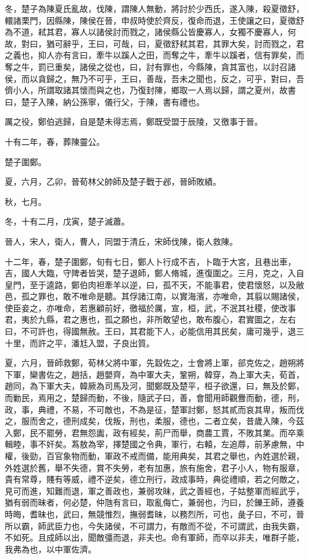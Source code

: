 \begin{pinyinscope}
冬，楚子為陳夏氏亂故，伐陳，謂陳人無動，將討於少西氏，遂入陳，殺夏徵舒，轘諸栗門，因縣陳，陳侯在晉，申叔時使於齊反，復命而退，王使讓之曰，夏徵舒為不道，弒其君，寡人以諸侯討而戮之，諸侯縣公皆慶寡人，女獨不慶寡人，何故，對曰，猶可辭乎，王曰，可哉，曰，夏徵舒弒其君，其罪大矣，討而戮之，君之義也，抑人亦有言曰，牽牛以蹊人之田，而奪之牛，牽牛以蹊者，信有罪矣，而奪之牛，罰已重矣，諸侯之從也，曰，討有罪也，今縣陳，貪其富也，以討召諸侯，而以貪歸之，無乃不可乎，王曰，善哉，吾未之聞也，反之，可乎，對曰，吾儕小人，所謂取諸其懷而與之也，乃復封陳，鄉取一人焉以歸，謂之夏州，故書曰，楚子入陳，納公孫寧，儀行父，于陳，書有禮也。

厲之役，鄭伯逃歸，自是楚未得志焉，鄭既受盟于辰陵，又徼事于晉。

十有二年，春，葬陳靈公。

楚子圍鄭。

夏，六月，乙卯，晉荀林父帥師及楚子戰于邲，晉師敗績。

秋，七月。

冬，十有二月，戊寅，楚子滅蕭。

晉人，宋人，衛人，曹人，同盟于清丘，宋師伐陳，衛人救陳。

十二年，春，楚子圍鄭，旬有七日，鄭人卜行成不吉，卜臨于大宮，且巷出車，吉，國人大臨，守陴者皆哭，楚子退師，鄭人脩城，進復圍之。三月，克之，入自皇門，至于逵路，鄭伯肉袒牽羊以逆，曰，孤不天，不能事君，使君懷怒，以及敝邑，孤之罪也，敢不唯命是聽。其俘諸江南，以實海濱，亦唯命，其翦以賜諸侯，使臣妾之，亦唯命，若惠顧前好，徼福於厲，宣，桓，武，不泯其社稷，使改事君，夷於九縣，君之惠也，孤之願也，非所敢望也，敢布腹心，君實圖之，左右曰，不可許也，得國無赦。王曰，其君能下人，必能信用其民矣，庸可幾乎，退三十里，而許之平，潘尪入盟，子良出質。

夏，六月，晉師救鄭，荀林父將中軍，先縠佐之，士會將上軍，郤克佐之，趙朔將下軍，欒書佐之，趙括，趙嬰齊，為中軍大夫，鞏朔，韓穿，為上軍大夫，荀首，趙同，為下軍大夫，韓厥為司馬及河，聞鄭既及楚平，桓子欲還，曰，無及於鄭，而勦民，焉用之，楚歸而動，不後，隨武子曰，善，會聞用師觀釁而動，德，刑，政，事，典禮，不易，不可敵也，不為是征，楚軍討鄭，怒其貳而哀其卑，叛而伐之，服而舍之，德刑成矣，伐叛，刑也，柔服，德也，二者立矣，昔歲入陳，今茲入鄭，民不罷勞，君無怨讟，政有經矣，荊尸而舉，商農工賈，不敗其業。而卒乘輯睦，事不奸矣。蒍敖為宰，擇楚國之令典，軍行，右轅，左追蓐，前茅慮無，中權，後勁，百官象物而動，軍政不戒而備，能用典矣，其君之舉也，內姓選於親，外姓選於舊，舉不失德，賞不失勞，老有加惠，旅有施舍，君子小人，物有服章，貴有常尊，賤有等威，禮不逆矣，德立刑行，政成事時，典從禮順，若之何敵之，見可而進，知難而退，軍之善政也，兼弱攻昧，武之善經也，子姑整軍而經武乎，猶有弱而昧者，何必楚，仲虺有言曰，取亂侮亡，兼弱也，汋曰，於鑠王師，遵養時晦，耆昧也，武曰，無競惟烈，撫弱耆昧，以務烈所，可也，彘子曰，不可，晉所以霸，師武臣力也，今失諸侯，不可謂力，有敵而不從，不可謂武，由我失霸，不如死。且成師以出，聞敵彊而退，非夫也。命有軍師，而卒以非夫，唯群子能，我弗為也，以中軍佐濟。


\end{pinyinscope}
